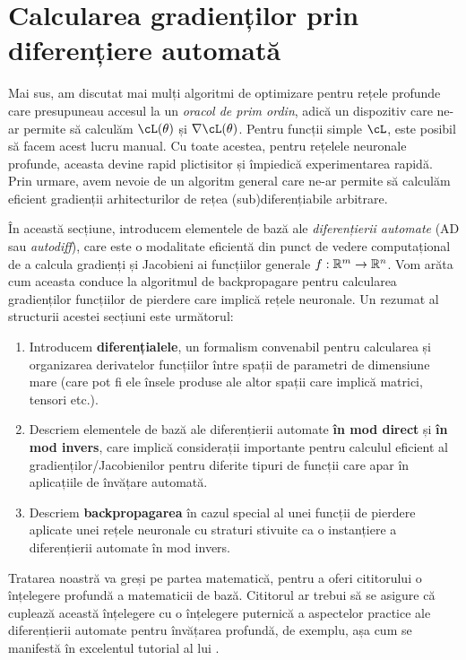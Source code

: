 \documentclass[../../book-main_ro.tex]{subfiles}
\begin{document}
\section{Calcularea gradienților prin diferențiere automată}\label{sec:autodiff}

Mai sus, am discutat mai mulți algoritmi de optimizare pentru rețele profunde care presupuneau accesul la un \textit{oracol de prim ordin}, adică un dispozitiv care ne-ar permite să calculăm \(\cL(\theta)\) și \(\nabla \cL(\theta)\).
Pentru funcții simple \(\cL\), este posibil să facem acest lucru manual.
Cu toate acestea, pentru rețelele neuronale profunde, aceasta devine rapid plictisitor și împiedică experimentarea rapidă.
Prin urmare, avem nevoie de un algoritm general care ne-ar permite să calculăm eficient gradienții arhitecturilor de rețea (sub)diferențiabile arbitrare.

În această secțiune, introducem elementele de bază ale \textit{diferențierii automate} (AD sau \textit{autodiff}), care este o modalitate eficientă din punct de vedere computațional de a calcula gradienți și Jacobieni ai funcțiilor generale $f: \mathbb{R}^m \to \mathbb{R}^n$. Vom arăta cum aceasta conduce la algoritmul de backpropagare pentru calcularea gradienților funcțiilor de pierdere care implică rețele neuronale.
Un rezumat al structurii acestei secțiuni este următorul:
\begin{enumerate}
    \item Introducem \textbf{diferențialele}, un formalism convenabil pentru calcularea și organizarea derivatelor funcțiilor între spații de parametri de dimensiune mare (care pot fi ele însele produse ale altor spații care implică matrici, tensori etc.).
    \item Descriem elementele de bază ale diferențierii automate \textbf{în mod direct} și \textbf{în mod invers}, care implică considerații importante pentru calculul eficient al gradienților/Jacobienilor pentru diferite tipuri de funcții care apar în aplicațiile de învățare automată.
    \item Descriem \textbf{backpropagarea} în cazul special al unei funcții de pierdere aplicate unei rețele neuronale cu straturi stivuite ca o instanțiere a diferențierii automate în mod invers.
\end{enumerate}

Tratarea noastră va greși pe partea matematică, pentru a oferi cititorului o înțelegere profundă a matematicii de bază. Cititorul ar trebui să se asigure că cuplează această înțelegere cu o înțelegere puternică a aspectelor practice ale diferențierii automate pentru învățarea profundă, de exemplu, așa cum se manifestă în excelentul tutorial al lui \textcite{karpathy-micrograd}.
\end{document}
